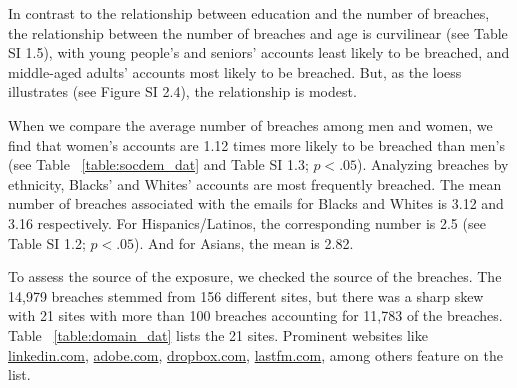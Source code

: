 \documentclass[sigconf]{acmart}
\begin{document}
In contrast to the relationship between education and the number of breaches, the relationship between the number of breaches and age is curvilinear (see Table SI 1.5), with young people's and seniors' accounts least likely to be breached, and middle-aged adults' accounts most likely to be breached. But, as the loess illustrates (see Figure SI 2.4), the relationship is modest.



When we compare the average number of breaches among men and women, we find that women's accounts are 1.12 times more likely to be breached than men's (see Table ~\ref{table:socdem_dat} and Table SI 1.3; $p < .05$). Analyzing breaches by ethnicity, Blacks' and Whites' accounts are most frequently breached. The mean number of breaches associated with the emails for Blacks and Whites is 3.12 and 3.16 respectively. For Hispanics/Latinos, the corresponding number is 2.5 (see Table SI 1.2; $p < .05$). And for Asians, the mean is 2.82.

To assess the source of the exposure, we checked the source of the breaches. The 14,979 breaches stemmed from 156 different sites, but there was a sharp skew with 21 sites with more than 100 breaches accounting for 11,783 of the breaches. Table ~\ref{table:domain_dat} lists the 21 sites. Prominent websites like \url{linkedin.com}, \url{adobe.com}, \url{dropbox.com}, \url{lastfm.com}, among others feature on the list.
\end{document}
